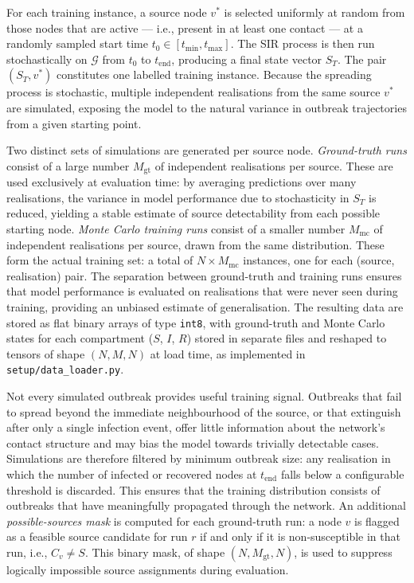 For each training instance, a source node $v^*$ is selected uniformly at random from those nodes that are active — i.e., present in at least one contact — at a randomly sampled start time $t_0 \in [t_{\min}, t_{\max}]$. The SIR process is then run stochastically on $\mathcal{G}$ from $t_0$ to $t_{\mathrm{end}}$, producing a final state vector $S_T$. The pair $(S_T, v^*)$ constitutes one labelled training instance. Because the spreading process is stochastic, multiple independent realisations from the same source $v^*$ are simulated, exposing the model to the natural variance in outbreak trajectories from a given starting point.

Two distinct sets of simulations are generated per source node. \textit{Ground-truth runs} consist of a large number $M_{\mathrm{gt}}$ of independent realisations per source. These are used exclusively at evaluation time: by averaging predictions over many realisations, the variance in model performance due to stochasticity in $S_T$ is reduced, yielding a stable estimate of source detectability from each possible starting node. \textit{Monte Carlo training runs} consist of a smaller number $M_{\mathrm{mc}}$ of independent realisations per source, drawn from the same distribution. These form the actual training set: a total of $N \times M_{\mathrm{mc}}$ instances, one for each (source, realisation) pair. The separation between ground-truth and training runs ensures that model performance is evaluated on realisations that were never seen during training, providing an unbiased estimate of generalisation. The resulting data are stored as flat binary arrays of type \texttt{int8}, with ground-truth and Monte Carlo states for each compartment ($S$, $I$, $R$) stored in separate files and reshaped to tensors of shape $(N, M, N)$ at load time, as implemented in \texttt{setup/data\_loader.py}.

Not every simulated outbreak provides useful training signal. Outbreaks that fail to spread beyond the immediate neighbourhood of the source, or that extinguish after only a single infection event, offer little information about the network's contact structure and may bias the model towards trivially detectable cases. Simulations are therefore filtered by minimum outbreak size: any realisation in which the number of infected or recovered nodes at $t_{\mathrm{end}}$ falls below a configurable threshold is discarded. This ensures that the training distribution consists of outbreaks that have meaningfully propagated through the network. An additional \textit{possible-sources mask} is computed for each ground-truth run: a node $v$ is flagged as a feasible source candidate for run $r$ if and only if it is non-susceptible in that run, i.e., $C_v \neq S$. This binary mask, of shape $(N, M_{\mathrm{gt}}, N)$, is used to suppress logically impossible source assignments during evaluation.

